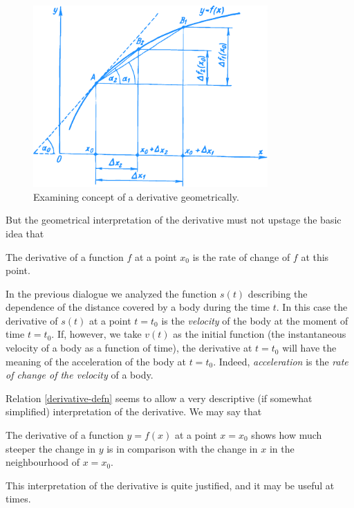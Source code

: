 \begin{figure}[!ht]%
\centering
\includegraphics[width=0.8\textwidth]{figures/fig-38.pdf}
\caption{Examining concept of a derivative geometrically.}
\label{fig-39}
\end{figure}

But the geometrical interpretation of the derivative must not upstage the basic idea that
\begin{mytheo}{}
The derivative of a function $f$ at a point $x_{0}$ is the rate of change of $f$ at this point.
\end{mytheo}

In the previous dialogue we analyzed the function $s (t)$ describing the dependence of the distance covered by a body during the time $t$. In this case the derivative of $s (t)$ at a point $t = t_{0}$ is the \emph{velocity} of the body at the moment of time $t = t_{0}$. If, however, we take $v (t)$ as the initial function (the instantaneous velocity of a body as a function of time), the derivative at  $t = t_{0}$ will have the meaning of the acceleration of the body at  $t = t_{0}$. Indeed, \emph{acceleration} is the \emph{rate of change of the velocity} of a body.

\rdr Relation \eqref{derivative-defn} seems to allow a very descriptive (if somewhat simplified) interpretation of the derivative. We may say that
\begin{mytheo}{}
The derivative of a function $y = f (x)$ at a point $x = x_{0}$ shows how much steeper the change in $y$ is in comparison with the change in $x$ in the neighbourhood of $x = x_{0}$.
\end{mytheo}

\athr This interpretation of the derivative is quite justified, and it may be useful at times.

